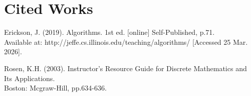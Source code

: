 \documentclass{article}
\newcommand{\separate}[1] {\vspace{#1 pt}\noindent}
\begin{document}
\section{Cited Works}

Erickson, J. (2019). Algorithms. 1st ed. [online] Self-Published, p.71. \\ Available at: http://jeffe.cs.illinois.edu/teaching/algorithms/ [Accessed 25 Mar. 2026].\label{cit:1.algorithms}

\separate{5}Rosen, K.H. (2003). Instructor's Resource Guide for Discrete Mathematics and Its Applications. \\ Boston: Mcgraw-Hill, pp.634-636.\label{cit:2.eulerianCircuits}
\end{document}

